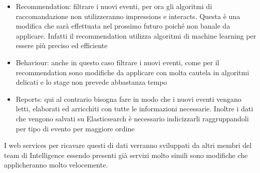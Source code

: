 \documentclass[a4paper, 12pt, twoside, openright]{book}
\begin{document}
\begin{itemize}
\item Recommendation: filtrare i nuovi eventi, per ora gli algoritmi di raccomandazione non utilizzeranno impressions e interacts. Questa è una modifica che sarà effettuata nel prossimo futuro poiché non banale da applicare. Infatti il recommendation utilizza algoritmi di machine learning per essere più preciso ed efficiente
\item Behaviour: anche in questo caso filtrare i nuovi eventi, come per il recommendation sono modifiche da applicare con molta cautela in algoritmi delicati e lo stage non prevede abbastanza tempo
\item Reports: qui al contrario bisogna fare in modo che i nuovi eventi vengano letti, elaborati ed arricchiti con tutte le informazioni necessarie. Inoltre i dati che vengono salvati su Elasticsearch è necessario indicizzarli raggruppandoli per tipo di evento per maggiore ordine
\end{itemize}
I web services per ricavare questi di dati verranno sviluppati da altri membri del team di Intelligence essendo presenti già servizi molto simili sono modifiche che applicheranno molto velocemente.
\end{document}
